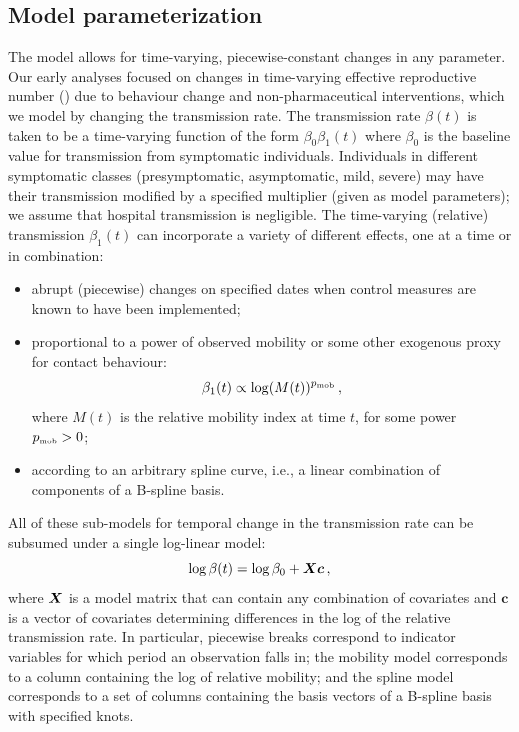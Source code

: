 \documentclass[12pt]{article}\usepackage[]{graphicx}\usepackage[]{color}
\begin{document}
\subsection*{Model parameterization}

The model allows for time-varying, piecewise-constant changes in any parameter. 
Our early analyses focused on changes in time-varying effective reproductive number (\Rt) due to behaviour change and non-pharmaceutical interventions, which we model by changing the transmission rate.
The transmission rate $\beta(t)$ is taken to be a time-varying function of the form $\beta_0 \beta_1(t)$ where $\beta_0$ is the baseline value for transmission from symptomatic individuals.
Individuals in different symptomatic classes (presymptomatic, asymptomatic, mild, severe) may have their transmission modified by a specified multiplier (given as model parameters); we assume that hospital transmission is negligible.
The time-varying (relative) transmission $\beta_1(t)$ can incorporate a variety of different effects, one at a time or in combination:
\begin{itemize}
\item abrupt (piecewise) changes on specified dates when control measures are known to have been implemented;
\item proportional to a power of observed mobility or some other exogenous proxy for contact behaviour:
\begin{equation}
  \beta_1(t) \propto \log(M(t))^{{{p}_{\textrm{\tiny mob}}}} \,, 
\end{equation}
where $M(t)$ is the relative mobility index at time $t$, for some power ${{p}_{\textrm{\tiny mob}}}>0$;
\item according to an arbitrary spline curve, i.e., a linear combination of components of a B-spline basis.
\end{itemize}
All of these sub-models for temporal change in the transmission rate can be subsumed under a single log-linear model:
\begin{equation}\label{eq:betamodel}
\log \beta(t) = \log \beta_0 + \boldsymbol{X}\boldsymbol{c}
\,,
\end{equation}
where $\boldsymbol{X}$ is a model matrix 
that can contain any combination of covariates and $\boldsymbol{c}$ is a vector of covariates determining differences in the log of the relative transmission rate.
In particular, piecewise breaks correspond to indicator variables for which period an observation falls in; the mobility model corresponds to a column containing the log of relative mobility; and the spline model corresponds to a set of columns containing the basis vectors of a B-spline basis with specified knots.
\end{document}
